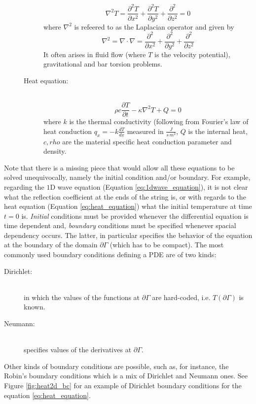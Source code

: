 \begin{description}
\begin{description}
     	\begin{equation}
     	\nabla^2T = \frac{\partial^2 T}{\partial x^2} + \frac{\partial^2 T}{\partial y^2}+ \frac{\partial^2}{\partial z^2}=0
     	\end{equation}
     	where $\nabla^2$ is refeered to as the Laplacian operator and given by $$\nabla^2=\nabla \cdot \nabla = \frac{\partial^2}{\partial x^2} + \frac{\partial^2}{\partial y^2} + \frac{\partial^2}{\partial z^2}$$ It often arises in fluid flow (where $T$ is the velocity potential), gravitational and bar torsion problems.
     \item [Heat equation:]\hfil \\  
     	\begin{equation}
     	 \rho c\frac{\partial T}{\partial t} - \kappa \nabla^2T +Q=0
     	\label{eq:heat_equation}
     	\end{equation}
     	where $k$ is the thermal conductivity (following from Fourier's law of heat conduction $q_x=-k\frac{dT}{dx}$ measured in $\frac{J}{s\, m^2}$, $Q$ is the internal heat, $c,rho$ are the material specific heat conduction parameter and density.
   \end{description}
\end{description}

Note that there is a missing piece that would allow all these equations to be solved unequivocally, namely the initial condition and/or boundary. For example, regarding the $1$D wave equation (Equation \ref{eq:1dwave_equation}), it is not clear what the reflection coefficient at the ends of the string is, or with  regards to the heat equation (Equation \ref{eq:heat_equation}) what  the initial temperature at time $t=0$ is. 
\textit{Initial} conditions must be provided whenever the differential equation is time dependent and, \textit{boundary} conditions must be specified whenever spacial dependency occurs. The latter, in particular specifies the behavior of the equation at the boundary of the domain $\partial \Gamma$ (which has to be compact). The most commonly used boundary conditions defining a PDE are of two kinds:
\begin{description}
	\item [Dirichlet:] \hfil \\ in which the values of the functions at $\partial \Gamma$ are hard-coded, i.e. $T(\partial \Gamma)$  is known.
	
	\item [Neumann:] \hfil \\ specifies values of the derivatives at $\partial \Gamma$.
	
\end{description} 
Other kinds of boundary conditions are possible, such as, for instance, the Robin's boundary conditions\cite{Estep:1996:CDE:548037} which is a mix of Dirichlet and Neumann ones. See Figure \ref{fig:heat2d_bc} for an example of Dirichlet boundary conditions for the equation \ref{eq:heat_equation}.

